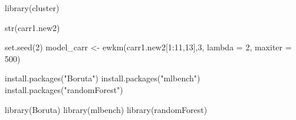 \documentclass[
]{article}
\newenvironment{Shaded}{\begin{snugshade}}{\end{snugshade}}
\newcommand{\AttributeTok}[1]{\textcolor[rgb]{0.77,0.63,0.00}{#1}}
\newcommand{\DecValTok}[1]{\textcolor[rgb]{0.00,0.00,0.81}{#1}}
\newcommand{\FunctionTok}[1]{\textcolor[rgb]{0.00,0.00,0.00}{#1}}
\newcommand{\NormalTok}[1]{#1}
\newcommand{\OtherTok}[1]{\textcolor[rgb]{0.56,0.35,0.01}{#1}}
\newcommand{\SpecialCharTok}[1]{\textcolor[rgb]{0.00,0.00,0.00}{#1}}
\newcommand{\StringTok}[1]{\textcolor[rgb]{0.31,0.60,0.02}{#1}}
\begin{document}
\begin{Shaded}
\begin{Highlighting}[]
\FunctionTok{library}\NormalTok{(cluster)}
\end{Highlighting}
\end{Shaded}

\begin{Shaded}
\end{Shaded}

\begin{Shaded}
\begin{Highlighting}[]
\FunctionTok{str}\NormalTok{(carr1.new2)}
\end{Highlighting}
\end{Shaded}

\begin{Shaded}
\begin{Highlighting}[]
\FunctionTok{set.seed}\NormalTok{(}\DecValTok{2}\NormalTok{)}
\NormalTok{model\_carr }\OtherTok{\textless{}{-}} \FunctionTok{ewkm}\NormalTok{(carr1.new2[}\DecValTok{1}\SpecialCharTok{:}\DecValTok{11}\NormalTok{,}\DecValTok{13}\NormalTok{],}\DecValTok{3}\NormalTok{, }\AttributeTok{lambda =} \DecValTok{2}\NormalTok{, }\AttributeTok{maxiter =} \DecValTok{500}\NormalTok{)}
\end{Highlighting}
\end{Shaded}

\begin{Shaded}
\begin{Highlighting}[]
\FunctionTok{install.packages}\NormalTok{(}\StringTok{"Boruta"}\NormalTok{)}
\FunctionTok{install.packages}\NormalTok{(}\StringTok{"mlbench"}\NormalTok{)}
\FunctionTok{install.packages}\NormalTok{(}\StringTok{"randomForest"}\NormalTok{)}
\end{Highlighting}
\end{Shaded}

\begin{Shaded}
\begin{Highlighting}[]
\FunctionTok{library}\NormalTok{(Boruta)}
\FunctionTok{library}\NormalTok{(mlbench)}
\FunctionTok{library}\NormalTok{(randomForest)}
\end{Highlighting}
\end{Shaded}
\end{document}
